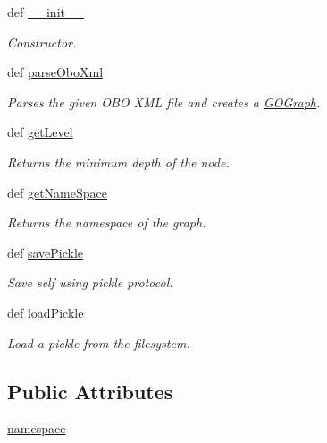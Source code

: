 \begin{DoxyCompactItemize}
\item 
def \hyperlink{class_g_o_graph_1_1_g_o_graph_afc10d41165dd1ae6c4cce09102542122}{\_\-\_\-init\_\-\_\-}
\begin{DoxyCompactList}\small\item\em Constructor. \item\end{DoxyCompactList}\item 
def \hyperlink{class_g_o_graph_1_1_g_o_graph_ac368b1e74799f1947d195e3e2bf7074c}{parseOboXml}
\begin{DoxyCompactList}\small\item\em Parses the given OBO XML file and creates a \hyperlink{class_g_o_graph_1_1_g_o_graph}{GOGraph}. \item\end{DoxyCompactList}\item 
def \hyperlink{class_g_o_graph_1_1_g_o_graph_aff70b5975f6e755e3304cfc3d4ef91a0}{getLevel}
\begin{DoxyCompactList}\small\item\em Returns the minimum depth of the node. \item\end{DoxyCompactList}\item 
def \hyperlink{class_g_o_graph_1_1_g_o_graph_aeef340ff2a82454a8d92d9711fd7a92b}{getNameSpace}
\begin{DoxyCompactList}\small\item\em Returns the namespace of the graph. \item\end{DoxyCompactList}\item 
def \hyperlink{class_g_o_graph_1_1_g_o_graph_ad97c179c4ec3d79a3092810ba1fbc241}{savePickle}
\begin{DoxyCompactList}\small\item\em Save self using pickle protocol. \item\end{DoxyCompactList}\item 
def \hyperlink{class_g_o_graph_1_1_g_o_graph_ada6b7d590cfca9d4baec8d082577ac21}{loadPickle}
\begin{DoxyCompactList}\small\item\em Load a pickle from the filesystem. \item\end{DoxyCompactList}\end{DoxyCompactItemize}
\subsection*{Public Attributes}
\begin{DoxyCompactItemize}
\item 
\hyperlink{class_g_o_graph_1_1_g_o_graph_af17f1eca2d2734e36976754e8ad4582a}{namespace}
\end{DoxyCompactItemize}


